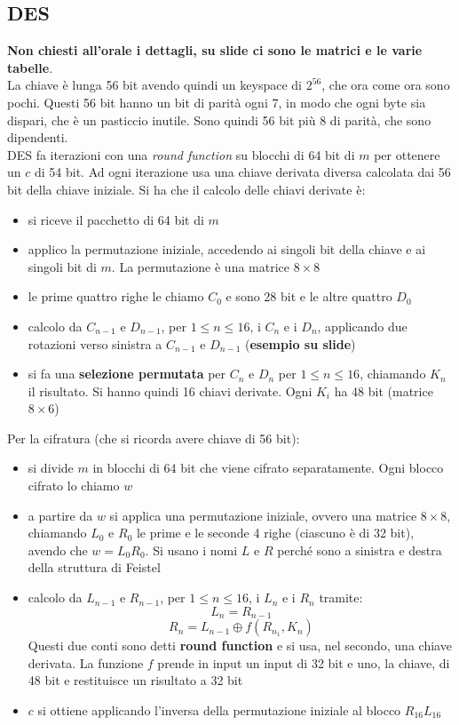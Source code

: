 \documentclass[a4paper,12pt, oneside]{book}
\begin{document}
\subsection{DES}
\textbf{Non chiesti all'orale i dettagli, su slide ci sono le matrici e le
  varie tabelle}.\\
La chiave è lunga 56 bit avendo quindi un keyspace di $2^{56}$, che ora come ora
sono pochi. Questi 56 bit hanno un bit di parità ogni 7, in modo che ogni byte
sia dispari, che è un pasticcio inutile. Sono quindi 56 bit più 8 di parità, che
sono dipendenti.\\
DES fa iterazioni con una \textit{round function} su blocchi di 64 bit di $m$
per ottenere un $c$ di 54 bit. Ad ogni iterazione usa una chiave derivata
diversa calcolata dai 56 bit della chiave iniziale. Si ha che il calcolo delle
chiavi derivate è:
\begin{itemize}
  \item si riceve il pacchetto di 64 bit di $m$
  \item applico la permutazione iniziale, accedendo ai singoli bit della chiave
  e ai singoli bit di $m$. La permutazione è una matrice $8\times 8$
  \item le prime quattro righe le chiamo $C_0$ e sono 28 bit e le altre quattro
  $D_0$ 
  \item calcolo da $C_{n-1}$ e $D_{n-1}$, per $1\leq n\leq 16$, i $C_n$ e i
  $D_n$, applicando due rotazioni verso sinistra a $C_{n-1}$ e $D_{n-1}$
  (\textbf{esempio su slide})
  \item si fa una \textbf{selezione permutata} per $C_n$ e $D_n$ per $1\leq
  n\leq 16$, chiamando $K_n$ il risultato. Si hanno quindi 16 chiavi
  derivate. Ogni $K_i$ ha 48 bit (matrice $8\times 6$)
\end{itemize}
Per la cifratura (che si ricorda avere chiave di 56 bit):
\begin{itemize}
  \item si divide $m$ in blocchi di 64 bit che viene cifrato separatamente. Ogni
  blocco cifrato lo chiamo $w$
  \item a partire da $w$ si applica una permutazione iniziale, ovvero una
  matrice $8\times 8$, chiamando $L_0$ e
  $R_0$ le prime e le seconde 4 righe (ciascuno è di 32 bit), avendo che
  $w=L_0R_0$. Si usano i nomi $L$ e $R$ perché sono a sinistra e destra della
  struttura di Feistel
  \item calcolo da $L_{n-1}$ e $R_{n-1}$, per $1\leq n\leq 16$, i $L_n$ e i
  $R_n$ tramite:
  \[L_n=R_{n-1}\]
  \[R_n=L_{n-1}\oplus f(R_{n_1},K_n)\]
  Questi due conti sono detti \textbf{round function} e si usa, nel secondo, una
  chiave derivata. La funzione $f$ prende in input un input di 32 bit e uno, la
  chiave, di 48 bit e restituisce un risultato a 32 bit
  \item $c$ si ottiene applicando l'inversa della permutazione iniziale al
  blocco $R_{16}L_{16}$ 
\end{itemize}
\end{document}

